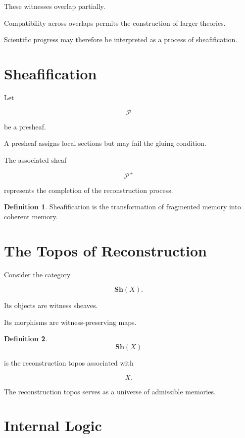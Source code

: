 \documentclass[12pt,oneside]{book}
\theoremstyle{plain} \newtheorem{theorem}{Theorem}[chapter] \newtheorem{lemma}[theorem]{Lemma} \newtheorem{proposition}[theorem]{Proposition} \newtheorem{corollary}[theorem]{Corollary}
\theoremstyle{definition} \newtheorem{definition}[theorem]{Definition} \newtheorem{axiom}[theorem]{Axiom} \newtheorem{construction}[theorem]{Construction}
\theoremstyle{remark} \newtheorem{remark}[theorem]{Remark} \newtheorem{example}[theorem]{Example}
\begin{document}
These witnesses overlap partially.

Compatibility across overlaps permits the construction of larger theories.

Scientific progress may therefore be interpreted as a process of sheafification.

\section{Sheafification}

Let

\[
\mathcal P
\]

be a presheaf.

A presheaf assigns local sections but may fail the gluing condition.

The associated sheaf

\[
\mathcal P^+
\]

represents the completion of the reconstruction process.

\begin{definition}

Sheafification is the transformation of fragmented memory into coherent memory.

\end{definition}

\section{The Topos of Reconstruction}

Consider the category

\[
\mathbf{Sh}(X).
\]

Its objects are witness sheaves.

Its morphisms are witness-preserving maps.

\begin{definition}

\[
\mathbf{Sh}(X)
\]

is the reconstruction topos associated with

\[
X.
\]

\end{definition}

The reconstruction topos serves as a universe of admissible memories.

\section{Internal Logic}
\end{document}
